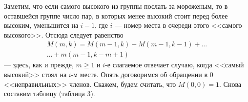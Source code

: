 \documentclass[12pt,a4paper]{scrartcl}
\begin{document}
\begin{multicols}{2}
		Заметим, что если самого высокого из группы послать за мороженым, то в оставшейся группе число пар, в которых менее высокий стоит перед более высоким, уменьшится на $i-1$, где $i$ --- номер места в очереди этого <<самого высокого>>. Отсюда следует равенство
		\begin{gather*}
			M(m,k)=M(m-1,k)+M(m-1,k-1)+\ldots \\
			 \ldots+m(m-1,k-m+1)   
		\end{gather*}
		--- здесь, как и прежде, $m\geqslant1$ и $i$-е слагаемое отвечает случаю, когда <<самый высокий>> стоял на $i$-м месте. Опять договоримся об обращении в 0 <<неправильных>> членов. Скажем, будем считать, что $M(0,0)=1$. Снова составим таблицу (таблица 3).
		
	\end{multicols}	

		
\end{document}

